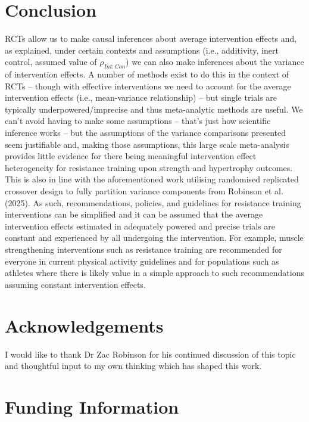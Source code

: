 \documentclass[
]{article}
\begin{document}
\section{Conclusion}\label{conclusion}

RCTs allow us to make causal inferences about average intervention
effects and, as explained, under certain contexts and assumptions (i.e.,
additivity, inert control, assumed value of \(\rho_{Int:Con}\)) we can
also make inferences about the variance of intervention effects. A
number of methods exist to do this in the context of RCTs -- though with
effective interventions we need to account for the average intervention
effects (i.e., mean-variance relationship) -- but single trials are
typically underpowered/imprecise and thus meta-analytic methods are
useful. We can't avoid having to make some assumptions -- that's just
how scientific inference works -- but the assumptions of the variance
comparisons presented seem justifiable and, making those assumptions,
this large scale meta-analysis provides little evidence for there being
meaningful intervention effect heterogeneity for resistance training
upon strength and hypertrophy outcomes. This is also in line with the
aforementioned work utilising randomised replicated crossover design to
fully partition variance components from Robinson et al. (2025). As
such, recommendations, policies, and guidelines for resistance training
interventions can be simplified and it can be assumed that the average
intervention effects estimated in adequately powered and precise trials
are constant and experienced by all undergoing the intervention. For
example, muscle strengthening interventions such as resistance training
are recommended for everyone in current physical activity guidelines and
for populations such as athletes where there is likely value in a simple
approach to such recommendations assuming constant intervention effects.

\section{Acknowledgements}\label{acknowledgements}

I would like to thank Dr Zac Robinson for his continued discussion of
this topic and thoughtful input to my own thinking which has shaped this
work.

\section{Funding Information}\label{funding-information}
\end{document}

